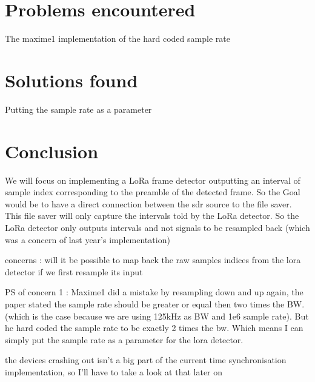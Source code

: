 \documentclass[a4paper, 12pt]{article}
\begin{document}
\section{Problems encountered} 
The maxime1 implementation of the hard coded sample rate

\section{Solutions found}
Putting the sample rate as a parameter

\section{Conclusion}
We will focus on implementing a LoRa frame detector outputting an interval of sample index corresponding to the preamble of the detected frame.
So the Goal would be to have a direct connection between the sdr source to the file saver. This file saver will only capture the intervals told by the LoRa detector. So the LoRa detector only outputs intervals and not signals to be resampled back (which was a concern of last year's implementation)

concerns : will it be possible to map back the raw samples indices from the lora detector if we first resample its input 

PS of concern 1 : Maxime1 did a mistake by resampling down and up again, the paper stated the sample rate should be greater or equal then two times the BW. (which is the case because we are using 125kHz as BW and 1e6 sample rate). But he hard coded the sample rate to be exactly 2 times the bw. Which means I can simply put the sample rate as a parameter for the lora detector.


the devices crashing out isn't a big part of the current time synchronisation implementation, so I'll have to take a look at that later on
\end{document}
